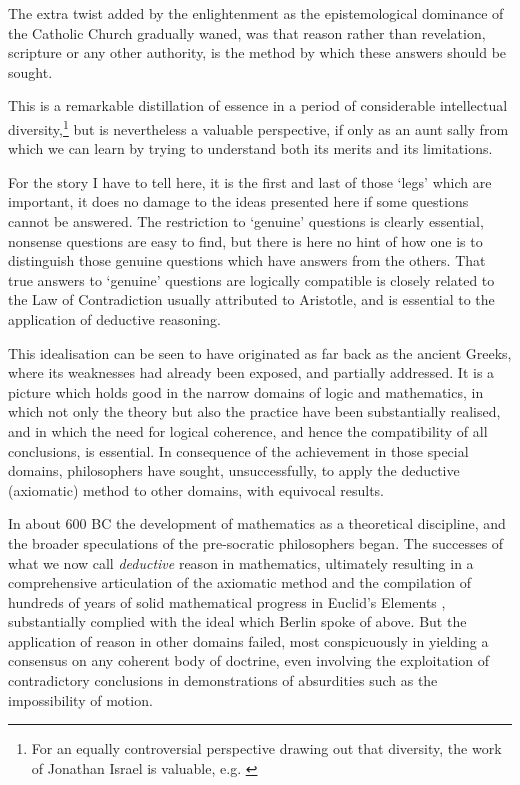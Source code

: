 \documentclass[10pt,titlepage]{book}
\begin{document}
The extra twist added by the enlightenment as the epistemological dominance of the Catholic Church gradually waned, was that reason rather than revelation, scripture or any other authority, is the method by which these answers should be sought.

This is a remarkable distillation of essence in a period of considerable intellectual diversity,\footnote{For an equally controversial perspective drawing out that diversity, the work of Jonathan Israel is valuable, e.g. \cite{israel2002radical, israel2013democratic}}%
 but is nevertheless a valuable perspective, if only as an aunt sally from which we can learn by trying to understand both its merits and its limitations.

 For the story I have to tell here, it is the first and last of those `legs' which are important, it does no damage to the ideas presented here if some questions cannot be answered.
 The restriction to `genuine' questions is clearly essential, nonsense questions are easy to find, but there is here no hint of how one is to distinguish those genuine questions which have answers from the others.
That true answers to `genuine' questions are logically compatible is closely related to the Law of Contradiction usually attributed to Aristotle, and is essential to the application of deductive reasoning.

 
 This idealisation can be seen to have originated as far back as the ancient Greeks, where its weaknesses had already been exposed, and partially addressed.
It is a picture which holds good in the narrow domains of logic and mathematics, in which not only the theory but also the practice have been substantially realised, and in which the need for logical coherence, and hence the compatibility of all conclusions, is essential. 
In consequence of the achievement in those special domains,  philosophers have sought, unsuccessfully, to apply the deductive (axiomatic) method to other domains, with equivocal results.

In about 600 BC the development of mathematics as a theoretical discipline, and the broader speculations of the pre-socratic philosophers began.
The successes of what we now call \emph{deductive} reason in mathematics, ultimately resulting in a comprehensive articulation of the axiomatic method and the compilation of hundreds of years of solid mathematical progress in Euclid's Elements \cite{euclidEL1}, substantially complied with the ideal which Berlin spoke of above.
But the application of reason in other domains failed, most conspicuously in yielding a consensus on any coherent body of doctrine, even involving the exploitation of contradictory conclusions in demonstrations of absurdities such as the impossibility of motion.
\end{document}
